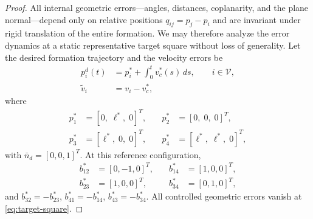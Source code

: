 \documentclass[letterpaper,journal]{IEEEtran}
\theoremstyle{plain}
\theoremstyle{definition}
\theoremstyle{remark}
\begin{document}
\begin{proof}
All internal geometric errors---angles, distances, coplanarity, and the plane normal---depend only on relative positions \(q_{ij}=p_j-p_i\) and are invariant under rigid translation of the entire formation. We may therefore analyze the error dynamics at a static representative target square without loss of generality. Let the desired formation trajectory and the velocity errors be
\begin{equation}
\begin{aligned}
p_i^d(t)&=p_i^*+\int_{0}^{t}v_c^*(s)\,ds,\qquad i\in\mathcal V,\\[4pt]
\tilde v_i&=v_i-v_c^*,
\end{aligned}
\label{eq:desired-trajectory}
\end{equation}
where
\begin{equation}
\begin{aligned}
p_1^*&=[0,\;\ell^*,\;0]^{T}, &\quad p_2^*&=[0,\;0,\;0]^{T},\\
p_3^*&=[\ell^*,\;0,\;0]^{T}, &\quad p_4^*&=[\ell^*,\;\ell^*,\;0]^{T},
\end{aligned}
\label{eq:target-square}
\end{equation}
with \(\bar n_d=[0,0,1]^T\). At this reference configuration,
\begin{equation}
\label{eq:target-bearings}
\begin{aligned}
b_{12}^*&=[0,-1,0]^{T}, &\quad b_{14}^*&=[1,0,0]^{T},\\
b_{23}^*&=[1,0,0]^{T},  &\quad b_{34}^*&=[0,1,0]^{T},
\end{aligned}
\end{equation}
and \(b_{32}^*=-b_{23}^*\), \(b_{41}^*=-b_{14}^*\), \(b_{43}^*=-b_{34}^*\). All controlled geometric errors vanish at \eqref{eq:target-square}.


\end{proof}
\end{document}
